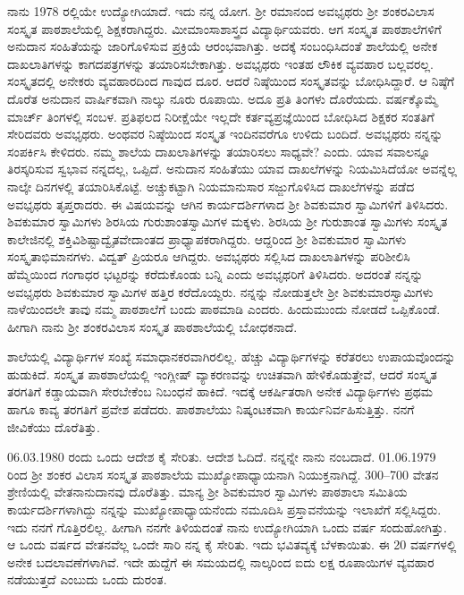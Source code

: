ನಾನು 1978 ರಲ್ಲಿಯೇ ಉದ್ಯೋಗಿಯಾದೆ.  ಇದು ನನ್ನ ಯೋಗ.  ಶ್ರೀ ರಮಾನಂದ ಅವಭೃಥರು ಶ್ರೀ ಶಂಕರವಿಲಾಸ ಸಂಸ್ಕೃತ ಪಾಠಶಾಲೆಯಲ್ಲಿ ಶಿಕ್ಷಕರಾಗಿದ್ದರು.  ಮೀಮಾಂಸಾಶಾಸ್ತ್ರದ ವಿದ್ಯಾರ್ಥಿಯವರು.  ಆಗ ಸಂಸ್ಕೃತ ಪಾಠಶಾಲೆಗಳಿಗೆ ಅನುದಾನ ಸಂಹಿತೆಯನ್ನು ಜಾರಿಗೊಳಿಸುವ ಪ್ರಕ್ರಿಯೆ ಆರಂಭವಾಗಿತ್ತು.  ಅದಕ್ಕೆ ಸಂಬಂಧಿಸಿದಂತೆ ಶಾಲೆಯಲ್ಲಿ ಅನೇಕ ದಾಖಲಾತಿಗಳನ್ನು ಕಾಗದಪತ್ರಗಳನ್ನು ತಯಾರಿಸಬೇಕಾಗಿತ್ತು.  ಅವಭೃಥರು ಇಂತಹ ಲೌಕಿಕ ವ್ಯವಹಾರ ಬಲ್ಲವರಲ್ಲ.  ಸಂಸ್ಕೃತದಲ್ಲಿ ಅನೇಕರು ವ್ಯವಹಾರದಿಂದ ಗಾವುದ ದೂರ.  ಆದರೆ ನಿಷ್ಠೆಯಿಂದ ಸಂಸ್ಕೃತವನ್ನು ಬೋಧಿಸಿದ್ದಾರೆ.  ಆ ನಿಷ್ಠೆಗೆ ದೊರೆತ ಅನುದಾನ ವಾರ್ಷಿಕವಾಗಿ ನಾಲ್ಕು ನೂರು ರೂಪಾಯಿ.  ಅದೂ ಪ್ರತಿ ತಿಂಗಳು ದೊರೆಯದು.  ವರ್ಷಕ್ಕೊಮ್ಮೆ ಮಾರ್ಚ್ ತಿಂಗಳಲ್ಲಿ ಸಂಬಳ.   ಪ್ರತಿಫಲದ ನಿರೀಕ್ಷೆಯೇ  ಇಲ್ಲದೇ ಕರ್ತವ್ಯಪ್ರಜ್ಞೆಯಿಂದ ಬೋಧಿಸಿದ ಶಿಕ್ಷಕರ ಸಂತತಿಗೆ ಸೇರಿದವರು ಅವಭೃಥರು.  ಅಂಥವರ ನಿಷ್ಠೆಯಿಂದ ಸಂಸ್ಕೃತ ಇಂದಿನವರೆಗೂ ಉಳಿದು ಬಂದಿದೆ.  ಅವಭೃಥರು ನನ್ನನ್ನು ಸಂಪರ್ಕಿಸಿ ಕೇಳಿದರು. ನಮ್ಮ ಶಾಲೆಯ ದಾಖಲಾತಿಗಳನ್ನು ತಯಾರಿಸಲು ಸಾಧ್ಯವೇ? ಎಂದು.  ಯಾವ ಸವಾಲನ್ನೂ ತಿರಸ್ಕರಿಸುವ ಸ್ವಭಾವ ನನ್ನದಲ್ಲ, ಒಪ್ಪಿದೆ.  ಅನುದಾನ ಸಂಹಿತೆಯು ಯಾವ ದಾಖಲೆಗಳನ್ನು ನಿಯಮಿಸಿದೆಯೋ ಅವನ್ನೆಲ್ಲ ನಾಲ್ಕೇ ದಿನಗಳಲ್ಲಿ ತಯಾರಿಸಿಕೊಟ್ಟೆ.  ಅಚ್ಚುಕಟ್ಟಾಗಿ ನಿಯಮಾನುಸಾರ ಸಜ್ಜುಗೊಳಿಸಿದ ದಾಖಲೆಗಳನ್ನು ಪಡೆದ ಅವಭೃಥರು ತೃಪ್ತರಾದರು.  ಈ ವಿಷಯವನ್ನು ಆಗಿನ ಕಾರ್ಯದರ್ಶಿಗಳಾದ ಶ್ರೀ ಶಿವಕುಮಾರ ಸ್ವಾಮಿಗಳಿಗೆ ತಿಳಿಸಿದರು.  ಶಿವಕುಮಾರ ಸ್ವಾಮಿಗಳು ಶಿರಸಿಯ ಗುರುಶಾಂತಸ್ವಾಮಿಗಳ ಮಕ್ಕಳು.  ಶಿರಸಿಯ ಶ್ರೀ ಗುರುಶಾಂತ ಸ್ವಾಮಿಗಳು ಸಂಸ್ಕೃತ ಕಾಲೇಜಿನಲ್ಲಿ  ಶಕ್ತಿವಿಶಿಷ್ಟಾದ್ವೈತವೇದಾಂತದ ಪ್ರಾಧ್ಯಾಪಕರಾಗಿದ್ದರು.  ಆದ್ದರಿಂದ ಶ್ರೀ ಶಿವಕುಮಾರ ಸ್ವಾಮಿಗಳು ಸಂಸ್ಕೃತಾಭಿಮಾನಗಳು. ವಿದ್ವತ್ ಪ್ರಿಯರೂ ಆಗಿದ್ದರು.  ಅವಭೃಥರು ಸಲ್ಲಿಸಿದ ದಾಖಲಾತಿಗಳನ್ನು ಪರಿಶೀಲಿಸಿ ಹೆಮ್ಮೆಯಿಂದ ಗಂಗಾಧರ ಭಟ್ಟರನ್ನು ಕರೆದುಕೊಂಡು ಬನ್ನಿ ಎಂದು ಅವಭೃಥರಿಗೆ ತಿಳಿಸಿದರು.  ಅದರಂತೆ ನನ್ನನ್ನು ಅವಭೃಥರು ಶಿವಕುಮಾರ ಸ್ವಾಮಿಗಳ ಹತ್ತಿರ ಕರೆದೊಯ್ದರು.  ನನ್ನನ್ನು ನೋಡುತ್ತಲೇ ಶ್ರೀ ಶಿವಕುಮಾರಸ್ವಾಮಿಗಳು ನಾಳೆಯಿಂದಲೇ ತಾವು ನಮ್ಮ ಪಾಠಶಾಲೆಗೆ ಬಂದು ಪಾಠಮಾಡಿ ಎಂದರು.  ಹಿಂದುಮುಂದು ನೋಡದೆ ಒಪ್ಪಿಕೊಂಡೆ.  ಹೀಗಾಗಿ ನಾನು ಶ್ರೀ ಶಂಕರವಿಲಾಸ ಸಂಸ್ಕೃತ ಪಾಠಶಾಲೆಯಲ್ಲಿ ಬೋಧಕನಾದೆ.  

ಶಾಲೆಯಲ್ಲಿ ವಿದ್ಯಾರ್ಥಿಗಳ ಸಂಖ್ಯೆ ಸಮಾಧಾನಕರವಾಗಿರಲಿಲ್ಲ.  ಹೆಚ್ಚು ವಿದ್ಯಾರ್ಥಿಗಳನ್ನು ಕರೆತರಲು ಉಪಾಯವೊಂದನ್ನು ಹುಡುಕಿದೆ.  ಸಂಸ್ಕೃತ ಪಾಠಶಾಲೆಯಲ್ಲಿ ಇಂಗ್ಲೀಷ್ ವ್ಯಾಕರಣವನ್ನು ಉಚಿತವಾಗಿ ಹೇಳಿಕೊಡುತ್ತೇವೆ, ಆದರೆ ಸಂಸ್ಕೃತ ತರಗತಿಗೆ ಕಡ್ಡಾಯವಾಗಿ ಸೇರಬೇಕೆಂಬ ನಿಬಂಧನೆ ಹಾಕಿದೆ.    ಇದಕ್ಕೆ ಆಕರ್ಷಿತರಾಗಿ ಅನೇಕ ವಿದ್ಯಾರ್ಥಿಗಳು ಪ್ರಥಮ ಹಾಗೂ ಕಾವ್ಯ ತರಗತಿಗೆ ಪ್ರವೇಶ ಪಡೆದರು.  ಪಾಠಶಾಲೆಯು ನಿಷ್ಕಂಟಕವಾಗಿ ಕಾರ್ಯನಿರ್ವಹಿಸುತ್ತಿತ್ತು.  ನನಗೆ ಜೀವಿಕೆಯು ದೊರೆತಿತ್ತು.  

06.03.1980 ರಂದು ಒಂದು ಆದೇಶ ಕೈ ಸೇರಿತು.  ಆದೇಶ ಓದಿದೆ.  ನನ್ನನ್ನೇ ನಾನು ನಂಬದಾದೆ.  01.06.1979 ರಿಂದ ಶ್ರೀ ಶಂಕರ ವಿಲಾಸ ಸಂಸ್ಕೃತ ಪಾಠಶಾಲೆಯ ಮುಖ್ಯೋಪಾಧ್ಯಾಯನಾಗಿ ನಿಯುಕ್ತನಾಗಿದ್ದೆ.  300–700 ವೇತನ ಶ್ರೇಣಿಯಲ್ಲಿ ವೇತನಾನುದಾನವು ದೊರೆತಿತ್ತು.  ಮಾನ್ಯ ಶ್ರೀ ಶಿವಕುಮಾರ ಸ್ವಾಮಿಗಳು ಪಾಠಶಾಲಾ ಸಮಿತಿಯ ಕಾರ್ಯದರ್ಶಿಗಳಾಗಿದ್ದು ನನ್ನನ್ನು ಮುಖ್ಯೋಪಾಧ್ಯಾಯನೆಂದು ನಮೂದಿಸಿ ಪ್ರಸ್ತಾವನೆಯನ್ನು ಇಲಾಖೆಗೆ ಸಲ್ಲಿಸಿದ್ದರು.  ಇದು ನನಗೆ ಗೊತ್ತಿರಲಿಲ್ಲ. ಹೀಗಾಗಿ ನನಗೇ ತಿಳಿಯದಂತೆ ನಾನು ಉದ್ಯೋಗಿಯಾಗಿ ಒಂದು ವರ್ಷ ಸಂದುಹೋಗಿತ್ತು.  ಆ ಒಂದು ವರ್ಷದ ವೇತನವೆಲ್ಲ ಒಂದೇ ಸಾರಿ ನನ್ನ ಕೈ ಸೇರಿತು.  ಇದು ಭವಿತವ್ಯಕ್ಕೆ ಬೆಳಕಾಯಿತು.  ಈ 20 ವರ್ಷಗಳಲ್ಲಿ ಅನೇಕ ಬದಲಾವಣೆಗಳಾಗಿವೆ.  ಇದೇ ಹುದ್ದೆಗೆ ಈ ಸಮಯದಲ್ಲಿ ನಾಲ್ಕರಿಂದ ಐದು ಲಕ್ಷ ರೂಪಾಯಿಗಳ ವ್ಯವಹಾರ ನಡೆಯುತ್ತದೆ ಎಂಬುದು ಒಂದು ದುರಂತ.  

